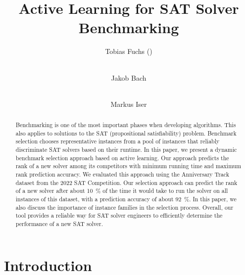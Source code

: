 \documentclass[runningheads]{llncs}
\begin{document}
\title{Active Learning for SAT Solver Benchmarking}

\author{
  Tobias Fuchs (\Letter) \and \\
  Jakob Bach \and \\
  Markus Iser
}



\maketitle

\begin{abstract}
  Benchmarking is one of the most important phases when developing algorithms.
  This also applies to solutions to the SAT (propositional satisfiability) problem.
  Benchmark selection chooses representative instances from a pool of instances that reliably discriminate SAT solvers based on their runtime.
  In this paper, we present a dynamic benchmark selection approach based on active learning.
  Our approach predicts the rank of a new solver among its competitors with minimum running time and maximum rank prediction accuracy.
  We evaluated this approach using the Anniversary Track dataset from the 2022 SAT Competition.
  Our selection approach can predict the rank of a new solver after about \SI{10}{\%} of the time it would take to run the solver on all instances of this dataset, with a prediction accuracy of about \SI{92}{\%}. 
  In this paper, we also discuss the importance of instance families in the selection process. 
  Overall, our tool provides a reliable way for SAT solver engineers to efficiently determine the performance of a new SAT solver.

\end{abstract}


\section{Introduction}
\label{sec:intro}
\end{document}

